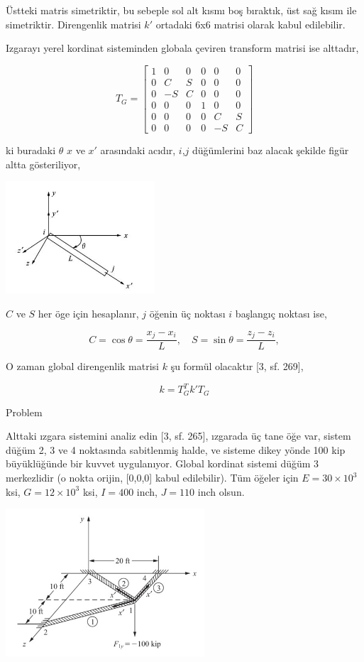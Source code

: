 \documentclass[12pt,fleqn]{article}\usepackage{../../common}
\begin{document}
Üstteki matris simetriktir, bu sebeple sol alt kısmı boş bıraktık, üst sağ kısım
ile simetriktir. Direngenlik matrisi $k'$ ortadaki 6x6 matrisi olarak kabul
edilebilir.

Izgarayı yerel kordinat sisteminden globala çeviren transform matrisi ise
alttadır,

$$
T_G = \left[\begin{array}{cccccc}
1 & 0 & 0 & 0 & 0 & 0 \\
0 & C & S & 0 & 0 & 0 \\ 
0 & -S & C & 0 & 0 & 0 \\ 
0 & 0 & 0 & 1 & 0 & 0 \\ 
0 & 0 & 0 & 0 & C & S \\ 
0 & 0 & 0 & 0 & -S & C 
\end{array}\right]
$$

ki buradaki $\theta$ $x$ ve $x'$ arasındaki acıdır, $i$,$j$ düğümlerini baz
alacak şekilde figür altta gösteriliyor,

\includegraphics[width=15em]{compscieng_bpp43fem_05.jpg}

$C$ ve $S$ her öge için hesaplanır, $j$ öğenin üç noktası $i$ başlangıç
noktası ise,

$$
C = \cos\theta = \frac{x_j - x_i}{L}, \quad
S = \sin\theta = \frac{z_j - z_i}{L},
$$

O zaman global direngenlik matrisi $k$ şu formül olacaktır [3, sf. 269],

$$
k = T_G^T k' T_G
$$

Problem

Alttaki ızgara sistemini analiz edin [3, sf. 265], ızgarada üç tane öğe var,
sistem düğüm 2, 3 ve 4 noktasında sabitlenmiş halde, ve sisteme dikey yönde 100
kip büyüklüğünde bir kuvvet uygulanıyor. Global kordinat sistemi düğüm 3
merkezlidir (o nokta orijin, [0,0,0] kabul edilebilir).  Tüm öğeler için $E = 30
\times 10^3$ ksi, $G = 12 \times 10^3$ ksi, $I = 400$ inch, $J = 110$ inch
olsun.

\includegraphics[width=20em]{compscieng_bpp43fem_06.jpg}
\end{document}
